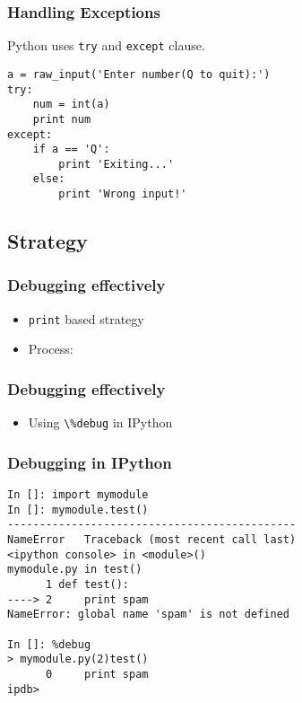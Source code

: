 \documentclass[compress,14pt]{beamer}
\newcommand{\typ}[1]{\lstinline{#1}}
\newcounter{time}
\newcommand{\inctime}[1]{\addtocounter{time}{#1}{\vspace*{0.1in}\tiny \thetime\ m}}
\begin{document}
\begin{frame}[fragile]
  \frametitle{Handling Exceptions}
  Python uses \typ{try} and \typ{except} clause.
  \begin{lstlisting}
a = raw_input('Enter number(Q to quit):')
try:
    num = int(a)
    print num
except:
    if a == 'Q':
        print 'Exiting...'
    else:
        print 'Wrong input!'      
  \end{lstlisting}
  
  
\end{frame}

\subsection{Strategy}
\begin{frame}[fragile]
    \frametitle{Debugging effectively}
    \begin{itemize}
        \item \typ{print} based strategy
        \item Process:
    \end{itemize}
\begin{center}
\end{center}
\end{frame}

\begin{frame}[fragile]
    \frametitle{Debugging effectively}
    \begin{itemize}
      \item Using \typ{\%debug} in IPython
    \end{itemize}
\end{frame}

\begin{frame}[fragile]
\frametitle{Debugging in IPython}
\small
\begin{lstlisting}
In []: import mymodule
In []: mymodule.test()
---------------------------------------------
NameError   Traceback (most recent call last)
<ipython console> in <module>()
mymodule.py in test()
      1 def test():
----> 2     print spam
NameError: global name 'spam' is not defined

In []: %debug
> mymodule.py(2)test()
      0     print spam
ipdb> 
\end{lstlisting}
\inctime{15} 
\end{frame}
\end{document}
